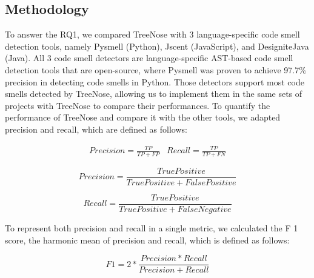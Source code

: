 \subsection{Methodology}
\label{sec:methodology}

To answer the RQ1, we compared TreeNose with 3 language-specific code smell detection tools, namely Pysmell 
(Python), Jscent (JavaScript), and DesigniteJava (Java).
All 3 code smell detectors are language-specific AST-based code smell detection tools 
that are open-source, where Pysmell was proven to achieve 97.7\% precision in detecting code smells in Python.
Those detectors support most code smells detected by TreeNose, allowing us to implement them in the same sets of projects with TreeNose to compare their performances.
To quantify the performance of TreeNose and compare it with the other tools, we adapted precision and recall, which are defined as follows:


\begin{align*}
    Precision = \frac{TP}{TP + FP} & Recall = \frac{TP}{TP + FN}
    \end{align*}


\begin{equation}
    Precision = \frac{True Positive}{True Positive + False Positive}
\end{equation}

\begin{equation}
    Recall = \frac{True Positive}{True Positive + False Negative}
\end{equation}

To represent both precision and recall in a single metric, we calculated the F 1 score, the harmonic mean of precision and recall, which is defined as follows:

\begin{equation}
    F1 = 2 * \frac{Precision * Recall}{Precision + Recall}
\end{equation}

